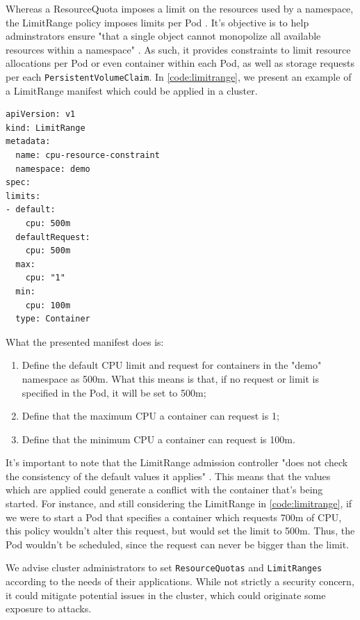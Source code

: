 \documentclass[a4paper,11pt,openright,BCOR=15mm]{scrbook}
\begin{document}
Whereas a ResourceQuota imposes a limit on the resources used by a namespace, the LimitRange policy imposes limits per Pod \cite{national_security_agency_kubernetes_2022}. It's objective is to help adminstrators ensure "that a single object cannot monopolize all available resources within a namespace" \cite{the_linux_foundation_limit_2024}. As such, it provides constraints to limit resource allocations per Pod or even container within each Pod, as well as storage requests per each \texttt{PersistentVolumeClaim}. In \ref{code:limitrange}, we present an example of a LimitRange manifest which could be applied in a cluster.


\begin{lstlisting}[style=yaml,caption={ResourceQuota example},label=code:limitrange]
apiVersion: v1
kind: LimitRange
metadata:
  name: cpu-resource-constraint
  namespace: demo
spec:
limits:
- default:
    cpu: 500m
  defaultRequest:
    cpu: 500m
  max:
    cpu: "1"
  min:
    cpu: 100m
  type: Container
\end{lstlisting}

What the presented manifest does is:
\begin{enumerate}
	\item Define the default CPU limit and request for containers in the "demo" namespace as 500m. What this means is that, if no request or limit is specified in the Pod, it will be set to 500m;
	\item Define that the maximum CPU a container can request is 1;
	\item Define that the minimum CPU a container can request is 100m.
\end{enumerate}

It's important to note that the LimitRange admission controller "does not check the consistency of the default values it applies" \cite{the_linux_foundation_limit_2024}. This means that the values which are applied could generate a conflict with the container that's being started. For instance, and still considering the LimitRange in \ref{code:limitrange}, if we were to start a Pod that specifies a container which requests 700m of CPU, this policy wouldn't alter this request, but would set the limit to 500m. Thus, the Pod wouldn't be scheduled, since the request can never be bigger than the limit.

We advise cluster administrators to set \texttt{ResourceQuotas} and \texttt{LimitRanges} according to the needs of their applications. While not strictly a security concern, it could mitigate potential issues in the cluster, which could originate some exposure to attacks.
\end{document}
